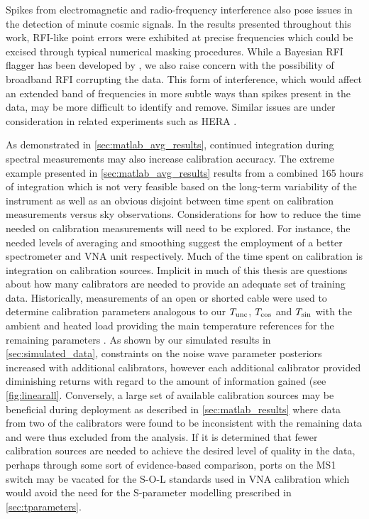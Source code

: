 Spikes from electromagnetic and radio-frequency interference also pose issues in the detection of minute cosmic signals. In the results presented throughout this work, RFI-like point errors were exhibited at precise frequencies which could be excised through typical numerical masking procedures. While a Bayesian RFI flagger has been developed by \citet{sam_rfi}, we also raise concern with the possibility of broadband RFI corrupting the data. This form of interference, which would affect an extended band of frequencies in more subtle ways than spikes present in the data, may be more difficult to identify and remove. Similar issues are under consideration in related experiments such as HERA \citep{hera_rfi}.

As demonstrated in \cref{sec:matlab_avg_results}, continued integration during spectral measurements may also increase calibration accuracy. The extreme example presented in \cref{sec:matlab_avg_results} results from a combined 165 hours of integration which is not very feasible based on the long-term variability of the instrument as well as an obvious disjoint between time spent on calibration measurements versus sky observations. Considerations for how to reduce the time needed on calibration measurements will need to be explored. For instance, the needed levels of averaging and smoothing suggest the employment of a better spectrometer and VNA unit respectively. Much of the time spent on calibration is integration on calibration sources. Implicit in much of this thesis are questions about how many calibrators are needed to provide an adequate set of training data. Historically, measurements of an open or shorted cable were used to determine calibration parameters analogous to our $T_{\mathrm{unc}}$, $T_{\mathrm{cos}}$ and $T_{\mathrm{sin}}$ \citep{rogersCal} with the ambient and heated load providing the main temperature references for the remaining parameters \citep{edgesCal}. As shown by our simulated results in \cref{sec:simulated_data}, constraints on the noise wave parameter posteriors increased with additional calibrators, however each additional calibrator provided diminishing returns with regard to the amount of information gained (see \cref{fig:linearall}. Conversely, a large set of available calibration sources may be beneficial during deployment as described in \cref{sec:matlab_results} where data from two of the calibrators were found to be inconsistent with the remaining data and were thus excluded from the analysis. If it is determined that fewer calibration sources are needed to achieve the desired level of quality in the data, perhaps through some sort of evidence-based comparison, ports on the MS1 switch may be vacated for the S-O-L standards used in VNA calibration which would avoid the need for the S-parameter modelling prescribed in \cref{sec:tparameters}.

